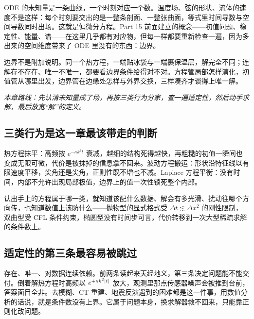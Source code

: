 ODE 的未知量是一条曲线，一个时刻对应一个数。温度场、弦的形状、流体的速度不是这样：每个时刻要交出的是一整条剖面、一整张曲面，等式里时间导数与空间导数同时出场。这就是偏微分方程。Part 15 前面建立的概念——初值问题、稳定性、能量、谱——在这里几乎都有对应物，但每一样都要重新检查一遍，因为多出来的空间维度带来了 ODE 里没有的东西：边界。

边界不是附加说明。同一个热方程，一端贴冰袋与一端裹保温层，解完全不同；连解存不存在、唯一不唯一，都要看边界条件给得对不对。方程管局部怎样演化，初值管从哪里出发，边界管在边缘处怎样与外界交换，三样凑齐才谈得上唯一解。

\begin{center}
\end{center}

\emph{本章路线：先认清未知量成了场，再按三类行为分家，查一遍适定性，然后动手求解，最后放宽``解''的定义。}

\subsection{三类行为是这一章最该带走的判断}

热方程抹平：高频按 \(e^{-\kappa k^2t}\) 衰减，越细的结构死得越快，再粗糙的初值一瞬间也变成无限可微，代价是被抹掉的信息拿不回来。波动方程搬运：形状沿特征线以有限速度平移，尖角还是尖角，正则性既不增也不减。Laplace 方程平衡：没有时间，内部不允许出现局部极值，边界上的值一次性锁死整个内部。

认出手上的方程属于哪一类，就知道该配什么数据、解会有多光滑、扰动往哪个方向传，也知道数值上该防什么——抛物型的显式格式受 \(\Delta t\lesssim\Delta x^2\) 的刚性限制，双曲型受 CFL 条件约束，椭圆型没有时间步可言，代价转移到一次大型稀疏求解的条件数上。

\subsection{适定性的第三条最容易被跳过}

存在、唯一、对数据连续依赖。前两条读起来天经地义，第三条决定问题能不能交付。倒着解热方程时高频以 \(e^{+\kappa k^2\left|t\right|}\) 放大，观测里那点传感器噪声会被推到台前，答案面目全非。去模糊、CT 重建、地震反演遇到的困难都是这一件事，用数值分析的话说，就是条件数没有上界。它属于问题本身，换求解器救不回来，只能靠正则化改问题。

